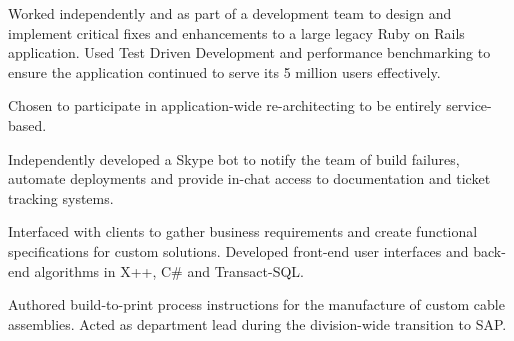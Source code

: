 
    Worked independently and as part of a development team to design and
    implement critical fixes and enhancements to a large legacy Ruby on Rails
    application. Used Test Driven Development and performance benchmarking to
    ensure the application continued to serve its 5 million users effectively.

    \begin{reslist}
      \item{Chosen to participate in application-wide re-architecting to be
        entirely service-based.}
      \item{Independently developed a Skype bot to notify the team of build
        failures, automate deployments and provide in-chat access to
        documentation and ticket tracking systems.}
    \end{reslist}


    Interfaced with clients to gather business requirements and create
    functional specifications for custom solutions. Developed front-end user
    interfaces and back-end algorithms in X++, C\# and Transact-SQL.

    \vspace{6 pt}


    Authored build-to-print process instructions for the manufacture of custom
    cable assemblies. Acted as department lead during the division-wide
    transition to SAP.

    \vspace{6 pt}



